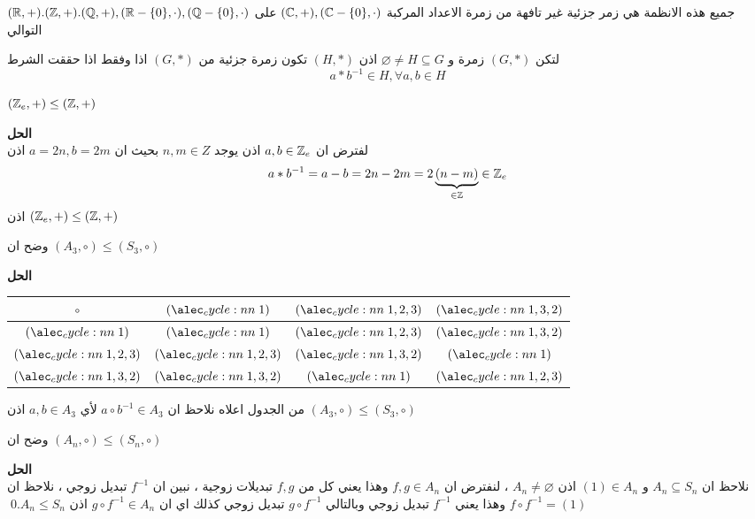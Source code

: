 \begin{example}
	$(\mathbb{R}, +). (\mathbb{Z}, +). (\mathbb{Q}, +), (\mathbb{R}-\{0\}, \cdot), (\mathbb{Q}-\{0\}, \cdot)$ جميع هذه الانظمة هي زمر جزئية غير تافهة من زمرة الاعداد المركبة $(\mathbb{C}, +), (\mathbb{C}-\{0\}, \cdot)$ على التوالي
\end{example}

\begin{theorem}
	لتكن $(G, *)$ زمرة و $\varnothing\neq H\subseteq G$ اذن $(H, *)$ تكون زمرة جزئية من $(G, *)$ اذا وفقط اذا حققت الشرط 
	\[
	a * b^{-1} \in H, \forall a, b\in H
	\]
\end{theorem}

\begin{example}
	$(\mathbb{Z}_e, +) \leq (\mathbb{Z}, +)$
\end{example}
\noindent
\textbf{الحل}\\
\noindent
لفترض ان $a, b\in \mathbb{Z}_e$ اذن يوجد $n,m\in Z$ بحيث ان $a=2n, b=2m$ اذن
\[
a * b^{-1} = a- b=2n-2m=2\underbrace{(n-m)}_{\in \mathbb{Z}} \in \mathbb{Z}_e
\]
اذن 	$(\mathbb{Z}_e, +) \leq (\mathbb{Z}, +)$

\begin{example}
	وضح ان $(A_3, \circ) \leq (S_3, \circ)$
\end{example}
\noindent
\textbf{الحل}
\begin{table}[H]
	\centering
	\renewcommand{\arraystretch}{1.3}
	\setLR
	\begin{tabular}{c|c|c|c}
		$\circ$ & $\cycle{1}$ & $\cycle{1,2,3}$ & $\cycle{1,3,2}$\\
		\hline
		$\cycle{1}$ & $\cycle{1}$ & $\cycle{1,2,3}$ & $\cycle{1,3,2}$\\
		$\cycle{1,2,3}$& $\cycle{1,2,3}$ & $\cycle{1,3,2}$&$\cycle{1}$\\
		$\cycle{1,3,2}$& $\cycle{1,3,2}$&$\cycle{1}$ & $\cycle{1,2,3}$ \\
		\hline
	\end{tabular}
\end{table}
\setRL
من الجدول اعلاه نلاحظ ان
 $a\circ b^{-1} \in A_3$
 لأي  $a, b\in A_3$ اذن  $(A_3, \circ) \leq (S_3, \circ)$
 
 \begin{example}
 	وضح ان  $(A_n, \circ) \leq (S_n, \circ)$
 \end{example}
 \noindent
 \textbf{الحل}\\
 \noindent
  نلاحظ ان $A_n \subseteq S_n $ و $(1) \in A_n$ اذن $A_n \neq \varnothing$ ، لنفترض ان $f, g \in A_n$ وهذا يعني كل من $f,g$ تبديلات زوجية ، نبين ان $f^{-1}$ تبديل زوجي ، نلاحظ ان $f\circ f^{-1}=(1)$ وهذا يعني $f^{-1}$ تبديل زوجي وبالتالي 
  $g\circ f^{-1}$ تبديل زوجي كذلك اي ان $g\circ f^{-1} \in A_n$ اذن $A_n \leq S_n$.\qed
  
